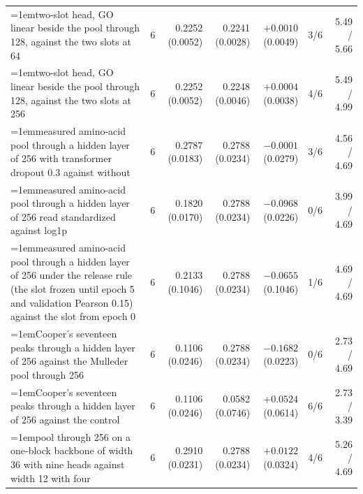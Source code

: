 \begin{table}[H]
\begin{tabular}{@{}>{\raggedright\hangindent=1em\hangafter=1\arraybackslash}p{78.5mm}rrrrrr@{}}
    two-slot head, GO linear beside the pool through 128, against the two slots at 64 & 6 & 0.2252 (0.0052) & 0.2241 (0.0028) & $+0.0010$ (0.0049) & 3/6 & 5.49 / 5.66 \\
    two-slot head, GO linear beside the pool through 128, against the two slots at 256 & 6 & 0.2252 (0.0052) & 0.2248 (0.0046) & $+0.0004$ (0.0038) & 4/6 & 5.49 / 4.99 \\
    measured amino-acid pool through a hidden layer of 256 with transformer dropout 0.3 against without & 6 & 0.2787 (0.0183) & 0.2788 (0.0234) & $-0.0001$ (0.0279) & 3/6 & 4.56 / 4.69 \\
    measured amino-acid pool through a hidden layer of 256 read standardized against log1p & 6 & 0.1820 (0.0170) & 0.2788 (0.0234) & $-0.0968$ (0.0226) & 0/6 & 3.99 / 4.69 \\
    measured amino-acid pool through a hidden layer of 256 under the release rule (the slot frozen until epoch 5 and validation Pearson 0.15) against the slot from epoch 0 & 6 & 0.2133 (0.1046) & 0.2788 (0.0234) & $-0.0655$ (0.1046) & 1/6 & 4.69 / 4.69 \\
    Cooper's seventeen peaks through a hidden layer of 256 against the Mulleder pool through 256 & 6 & 0.1106 (0.0246) & 0.2788 (0.0234) & $-0.1682$ (0.0223) & 0/6 & 2.73 / 4.69 \\
    Cooper's seventeen peaks through a hidden layer of 256 against the control & 6 & 0.1106 (0.0246) & 0.0582 (0.0746) & $+0.0524$ (0.0614) & 6/6 & 2.73 / 3.39 \\
    pool through 256 on a one-block backbone of width 36 with nine heads against width 12 with four & 6 & 0.2910 (0.0231) & 0.2788 (0.0234) & $+0.0122$ (0.0324) & 4/6 & 5.26 / 4.69 \\
    \hline
  \end{tabular}
\end{table}

